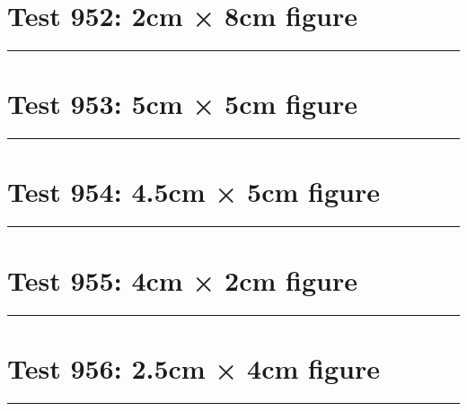 \documentclass[a4paper,11pt]{article}
\begin{document}
\section*{Test 952: 2cm × 8cm figure}
\begin{swarmwrap}%
  \begin{minipage}[t]{2cm}
    \centering
    \rule{\linewidth}{8cm}
  \end{minipage}%
\end{swarmwrap}%
\swarmwrapnext
\lipsum[43]
\lipsum[44]
\lipsum[45]
\section*{Test 953: 5cm × 5cm figure}
\begin{swarmwrap}%
  \begin{minipage}[t]{5cm}
    \centering
    \rule{\linewidth}{5cm}
  \end{minipage}%
\end{swarmwrap}%
\swarmwrapnext
\lipsum[59]
\lipsum[60]
\lipsum[61]
\lipsum[62]
\section*{Test 954: 4.5cm × 5cm figure}
\begin{swarmwrap}%
  \begin{minipage}[t]{4cm}
    \centering
    \rule{\linewidth}{5cm}
  \end{minipage}%
\end{swarmwrap}%
\swarmwrapnext
\lipsum[106]
\lipsum[107]
\lipsum[108]
\lipsum[109]
\lipsum[110]
\section*{Test 955: 4cm × 2cm figure}
\begin{swarmwrap}%
  \begin{minipage}[t]{4cm}
    \centering
    \rule{\linewidth}{2cm}
  \end{minipage}%
\end{swarmwrap}%
\swarmwrapnext
\lipsum[123]
\lipsum[124]
\lipsum[125]
\section*{Test 956: 2.5cm × 4cm figure}
\begin{swarmwrap}%
  \begin{minipage}[t]{2cm}
    \centering
    \rule{\linewidth}{4cm}
  \end{minipage}%
\end{swarmwrap}%
\swarmwrapnext
\lipsum[59]
\lipsum[60]
\lipsum[61]
\end{document}
